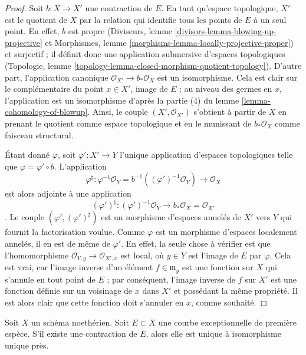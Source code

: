 \begin{proof} Soit $b : X \to X'$ une contraction de $E$. En tant qu'espace topologique, $X'$ est le quotient de $X$ par la relation qui identifie tous les points de $E$ à un seul point. En effet, $b$ est propre (Diviseurs, lemme \ref{divisors-lemma-blowing-up-projective} et Morphismes, lemme \ref{morphisms-lemma-locally-projective-proper}) et surjectif ; il définit donc une application submersive d'espaces topologiques (Topologie, lemme \ref{topology-lemma-closed-morphism-quotient-topology}). D'autre part, l'application canonique $\mathcal{O}_{X'} \to b_*\mathcal{O}_X$ est un isomorphisme. Cela est clair sur le complémentaire du point $x \in X'$, image de $E$ ; au niveau des germes en $x$, l'application est un isomorphisme d'après la partie (4) du lemme \ref{lemma-cohomology-of-blowup}. Ainsi, le couple $(X', \mathcal{O}_{X'})$ s'obtient à partir de $X$ en prenant le quotient comme espace topologique et en le munissant de $b_*\mathcal{O}_X$ comme faisceau structural.

\medskip\noindent Étant donné $\varphi$, soit $\varphi' : X' \to Y$ l'unique application d'espaces topologiques telle que $\varphi = \varphi' \circ b$. L'application $$
\varphi^\sharp : \varphi^{-1}\mathcal{O}_Y =
b^{-1}((\varphi')^{-1}\mathcal{O}_Y) \to \mathcal{O}_X
$$ est alors adjointe à une application $$
(\varphi')^\sharp :
(\varphi')^{-1}\mathcal{O}_Y \to b_*\mathcal{O}_X = \mathcal{O}_{X'}
$$. Le couple $(\varphi', (\varphi')^\sharp)$ est un morphisme d'espaces annelés de $X'$ vers $Y$ qui fournit la factorisation voulue. Comme $\varphi$ est un morphisme d'espaces localement annelés, il en est de même de $\varphi'$. En effet, la seule chose à vérifier est que l'homomorphisme $\mathcal{O}_{Y, y} \to \mathcal{O}_{X', x}$ est local, où $y \in Y$ est l'image de $E$ par $\varphi$. Cela est vrai, car l'image inverse d'un élément $f \in \mathfrak m_y$ est une fonction sur $X$ qui s'annule en tout point de $E$ ; par conséquent, l'image inverse de $f$ sur $X'$ est une fonction définie sur un voisinage de $x$ dans $X'$ et possédant la même propriété. Il est alors clair que cette fonction doit s'annuler en $x$, comme souhaité. \end{proof}

\begin{lemma} \label{lemma-contraction-unique} Soit $X$ un schéma noethérien. Soit $E \subset X$ une courbe exceptionnelle de première espèce. S'il existe une contraction de $E$, alors elle est unique à isomorphisme unique près. \end{lemma}

